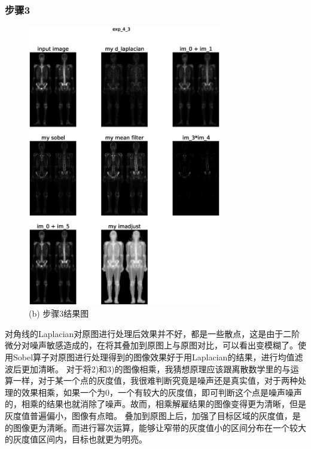 \documentclass[]{IEEEphot}
\begin{document}
\subsubsection{步骤3}
\begin{figure}[h]
	\centering
	\includegraphics[width=20pc]{exp_4_3.eps}
	\caption{(b) 步骤3结果图}
	\label{fig_env1}
\end{figure}
对角线的Laplacian对原图进行处理后效果并不好，都是一些散点，这是由于二阶微分对噪声敏感造成的，在将其叠加到原图上与原图对比，可以看出变模糊了。使用Sobel算子对原图进行处理得到的图像效果好于用Laplacian的结果，进行均值滤波后更加清晰。
对于将2)和3)的图像相乘，我猜想原理应该跟离散数学里的与运算一样，对于某一个点的灰度值，我很难判断究竟是噪声还是真实值，对于两种处理的效果相乘，如果一个为0，一个有较大的灰度值，即可判断这个点是噪声噪声的，相乘的结果也就消除了噪声。故而，相乘解雇结果的图像变得更为清晰，但是灰度值普遍偏小，图像有点暗。
叠加到原图上后，加强了目标区域的灰度值，是的图像更为清晰。而进行幂次运算，能够让窄带的灰度值小的区间分布在一个较大的灰度值区间内，目标也就更为明亮。
\end{document}
